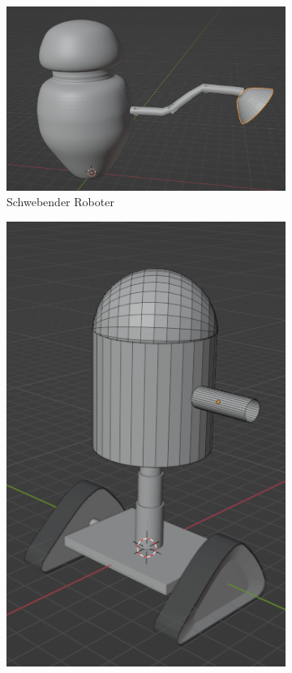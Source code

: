 \begin{figure}[H]
	\begin{subfigure}{0.4\textwidth}
		\centering
		\includegraphics[height=0.3\pageheight,keepaspectratio]{pics/6}
		\caption{Schwebender Roboter}
	\end{subfigure}
	\begin{subfigure}{0.4\textwidth}
		\centering
		\includegraphics[height=0.3\pageheight,keepaspectratio]{pics/7}

\end{subfigure}
\end{figure}
